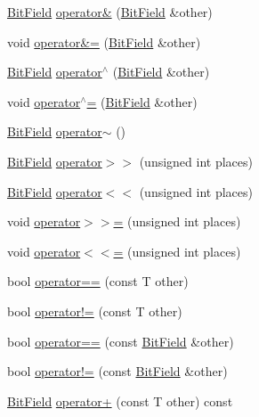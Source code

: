 \begin{DoxyCompactItemize}
\item 
\hyperlink{structmc_1_1_bit_field}{Bit\+Field} \hyperlink{structmc_1_1_bit_field_ac36f32787973aaecedde86ebcd4cd273}{operator\&} (\hyperlink{structmc_1_1_bit_field}{Bit\+Field} \&other)
\item 
void \hyperlink{structmc_1_1_bit_field_a02056d33683d80743ef57725fb2a0303}{operator\&=} (\hyperlink{structmc_1_1_bit_field}{Bit\+Field} \&other)
\item 
\hyperlink{structmc_1_1_bit_field}{Bit\+Field} \hyperlink{structmc_1_1_bit_field_a19ef0e1bf9a2441623be0d05c5db55ad}{operator$^\wedge$} (\hyperlink{structmc_1_1_bit_field}{Bit\+Field} \&other)
\item 
void \hyperlink{structmc_1_1_bit_field_a7db6848c5b53e6902f506a932b518193}{operator$^\wedge$=} (\hyperlink{structmc_1_1_bit_field}{Bit\+Field} \&other)
\item 
\hyperlink{structmc_1_1_bit_field}{Bit\+Field} \hyperlink{structmc_1_1_bit_field_ad56413893e6d94f38e44eff687d7d148}{operator$\sim$} ()
\item 
\hyperlink{structmc_1_1_bit_field}{Bit\+Field} \hyperlink{structmc_1_1_bit_field_a4ff08e1988590ff4ae6734e75277511c}{operator$>$$>$} (unsigned int places)
\item 
\hyperlink{structmc_1_1_bit_field}{Bit\+Field} \hyperlink{structmc_1_1_bit_field_a90062b344aa2b8b6281e03130fce267a}{operator$<$$<$} (unsigned int places)
\item 
void \hyperlink{structmc_1_1_bit_field_a16086ebd9bba8058c52658fdf38d0c02}{operator$>$$>$=} (unsigned int places)
\item 
void \hyperlink{structmc_1_1_bit_field_aff70db13dd90d3b7cbdea735149745ff}{operator$<$$<$=} (unsigned int places)
\item 
bool \hyperlink{structmc_1_1_bit_field_aabeee53efa39fb42e90288606ed3ceb0}{operator==} (const T other)
\item 
bool \hyperlink{structmc_1_1_bit_field_a0bf464fa4d3c8d13cd41766f8afc74ff}{operator!=} (const T other)
\item 
bool \hyperlink{structmc_1_1_bit_field_a2b8416826b8ab4bf8aeb71a7bb31d76f}{operator==} (const \hyperlink{structmc_1_1_bit_field}{Bit\+Field} \&other)
\item 
bool \hyperlink{structmc_1_1_bit_field_ad9a3d29d969a60c4839485b4eba596d0}{operator!=} (const \hyperlink{structmc_1_1_bit_field}{Bit\+Field} \&other)
\item 
\hyperlink{structmc_1_1_bit_field}{Bit\+Field} \hyperlink{structmc_1_1_bit_field_ae73bff10ebcb9476e8772da6e05bd123}{operator+} (const T other) const 

\end{DoxyCompactItemize}
